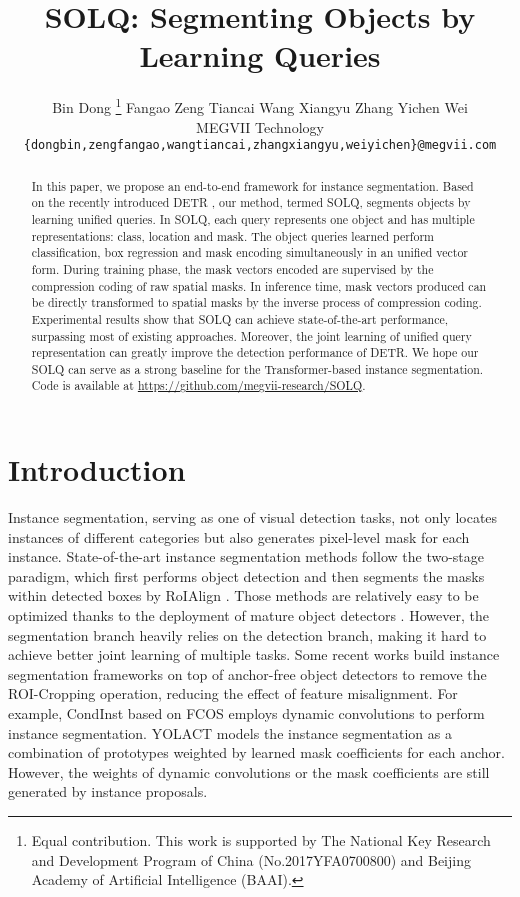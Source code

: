 \documentclass{article}
\title{SOLQ: Segmenting Objects by Learning Queries}
\author{Bin Dong \thanks{Equal contribution. This work is supported by The National Key Research and Development Program of China (No.2017YFA0700800) and Beijing Academy of Artificial Intelligence (BAAI).} \qquad Fangao Zeng  \qquad Tiancai Wang  \qquad Xiangyu Zhang \qquad Yichen Wei \\
  MEGVII Technology\\
  \texttt{{\tt\small {\{dongbin,zengfangao,wangtiancai,zhangxiangyu,weiyichen\}}@megvii.com}} \\
}
\begin{document}
\maketitle

\begin{abstract}
In this paper, we propose an end-to-end framework for instance segmentation. Based on the recently introduced DETR \cite{carion2020detr}, our method, termed SOLQ, segments objects by learning unified queries. In SOLQ, each query represents one object and has multiple representations: class, location and mask. The object queries learned perform classification, box regression and mask encoding simultaneously in an unified vector form. During training phase, the mask vectors encoded are supervised by the compression coding of raw spatial masks. In inference time, mask vectors produced can be directly transformed to spatial masks by the inverse process of compression coding. Experimental results show that SOLQ can achieve state-of-the-art performance, surpassing most of existing approaches. Moreover, the joint learning of unified query representation can greatly improve the detection performance of DETR. We hope our SOLQ can serve as a strong baseline for the Transformer-based instance segmentation. Code is available at \url{https://github.com/megvii-research/SOLQ}.
\end{abstract}

\section{Introduction}
Instance segmentation, serving as one of visual detection tasks, not only locates instances of different categories but also generates pixel-level mask for each instance. State-of-the-art instance segmentation methods \cite{he2017maskrcnn, huang2019maskscoringrcnn, chen2019hybrid, liu2018panet} follow the two-stage paradigm, which first performs object detection and then segments the masks within detected boxes by RoIAlign \cite{he2017maskrcnn}. Those methods are relatively easy to be optimized thanks to the deployment of mature object detectors \cite{ren2015faster, cai2018cascade}. However, the segmentation branch heavily relies on the detection branch, making it hard to achieve better joint learning of multiple tasks. 
Some recent works \cite{bolya2019yolact, tian2020conditional, lee2020centermask, peng2020deepsnake} build instance segmentation frameworks on top of anchor-free object detectors \cite{tian2019fcos, duan2019centernet} to remove the ROI-Cropping operation, reducing the effect of feature misalignment. For example, CondInst \cite{tian2020conditional} based on FCOS \cite{tian2019fcos} employs dynamic convolutions \cite{jia2016dynamicconv} to perform instance segmentation. YOLACT \cite{bolya2019yolact} models the instance segmentation as a combination of prototypes weighted by learned mask coefficients for each anchor. However, the weights of dynamic convolutions or the mask coefficients are still generated by instance proposals. 
\end{document}
